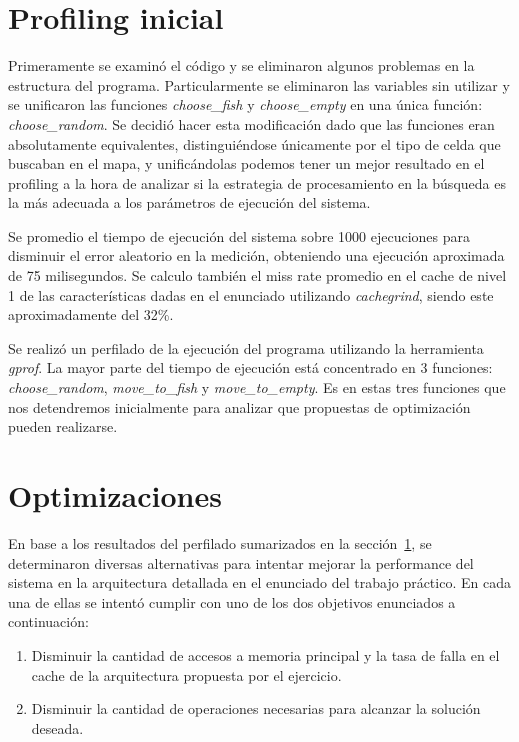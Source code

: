 \documentclass[a4paper,11pt]{article}
\begin{document}
\section{Profiling inicial} \label{sec:profinicial}

Primeramente se examinó el código y se eliminaron algunos problemas en la
estructura del programa. Particularmente se eliminaron las variables sin
utilizar y se unificaron las funciones \textit{choose\_fish} y
\textit{choose\_empty} en una única función: \textit{choose\_random}. Se
decidió hacer esta modificación dado que las funciones eran absolutamente
equivalentes, distinguiéndose únicamente por el tipo de celda que buscaban en
el mapa, y unificándolas podemos tener un mejor resultado en el profiling a la
hora de analizar si la estrategia de procesamiento en la búsqueda es la más
adecuada a los parámetros de ejecución del sistema.

Se promedio el tiempo de ejecución del sistema sobre 1000 ejecuciones para
disminuir el error aleatorio en la medición, obteniendo una ejecución
aproximada de 75 milisegundos. Se calculo también el miss rate promedio en el
cache de nivel 1 de las características dadas en el enunciado utilizando
\textit{cachegrind}, siendo este aproximadamente del 32\%.

Se realizó un perfilado de la ejecución del programa utilizando la herramienta
\textit{gprof}. La mayor parte del tiempo de ejecución está concentrado en 3
funciones: \textit{choose\_random}, \textit{move\_to\_fish} y
\textit{move\_to\_empty}. Es en estas tres funciones que nos detendremos
inicialmente para analizar que propuestas de optimización pueden realizarse.

\section{Optimizaciones}

En base a los resultados del perfilado sumarizados en la
sección~\ref{sec:profinicial}, se determinaron diversas alternativas para
intentar mejorar la performance del sistema en la arquitectura detallada en el
enunciado del trabajo práctico. En cada una de ellas se intentó cumplir con uno
de los dos objetivos enunciados a continuación:

\begin{enumerate}

  \item Disminuir la cantidad de accesos a memoria principal y la tasa de falla
      en el cache de la arquitectura propuesta por el ejercicio.

  \item Disminuir la cantidad de operaciones necesarias para alcanzar la
      solución deseada.

\end{enumerate}
\end{document}
